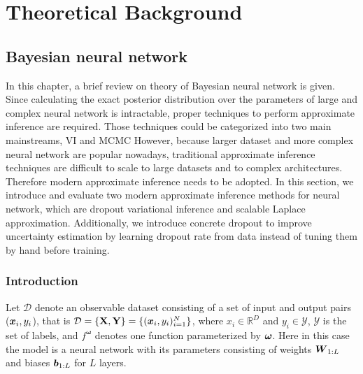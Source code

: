 \chapter{Theoretical Background}


\section{Bayesian neural network}
In this chapter, a brief review on theory of Bayesian neural network is given. Since calculating the exact posterior distribution over the parameters of large and complex neural network is intractable, proper techniques to perform approximate inference are required. Those techniques could be categorized into two main mainstreams, VI and MCMC %
However, because larger dataset and more complex neural network are popular nowadays, traditional approximate inference techniques are difficult to scale to large datasets and to complex architectures. Therefore modern approximate inference needs to be adopted. In this section, we introduce and evaluate two modern approximate inference methods for neural network, which are dropout variational inference\cite{gal2016dropout} and scalable Laplace approximation\cite{ritter2018scalable}. Additionally, we introduce concrete dropout \cite{gal2017concrete} to improve uncertainty estimation by learning dropout rate from data instead of tuning them by hand before training. 


\subsection{Introduction}

Let $\mathcal{D}$ denote an observable dataset consisting of a set of input and output pairs ($\boldsymbol x_i, y_i$), that is $\mathcal{D} = \{\mathbf{X}, \mathbf{Y}\} = \{(\boldsymbol x_{i}, y_{i})_{i=1}^{N}\}$, where $x_{i}\in\mathbb{R}^{D}$ and $y_{i}\in\mathcal{Y}$, $\mathcal{Y}$ is the set of labels, and $f^{\boldsymbol{\omega}}$ denotes one function parameterized by $\boldsymbol \omega$. Here in this case the model is a neural network with its parameters {\boldmath{$\omega$}} consisting of weights $\boldsymbol W_{1:L}$ and biases $\boldsymbol b_{1:L}$ for $L$ layers. 

